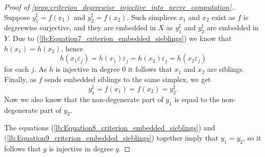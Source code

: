 \begin{proof}[Proof of \cref{prop:criterion_degreewise_injective_into_nerve_computation}.]
Suppose $y_1^\sharp =f(x_1)$ and $y_2^\sharp =f(x_2)$. Such simplices $x_1$ and $x_2$ exist as $f$ is degreewise surjective, and they are embedded in $X$ as $y_1^\sharp$ and $y_2^\sharp$ are embedded in $Y$. Due to (\ref{lb:Equation7_criterion_embedded_sieblings}) we know that $h(x_1)=h(x_2)$, hence
\[h(x_1\varepsilon _j)=h(x_1)\varepsilon _j=h(x_2)\varepsilon _j=h(x_2\varepsilon _j)\]
for each $j$. As $h$ is injective in degree $0$ it follows that $x_1$ and $x_2$ are siblings. Finally, as $f$ sends embedded siblings to the same simplex, we get
\begin{equation}\label{lb:Equation9_criterion_embedded_sieblings}
y_1^\sharp =f(x_1)=f(x_2)=y_2^\sharp .
\end{equation}
Now we also know that the non-degenerate part of $y_1$ is equal to the non-degenerate part of $y_2$.

The equations (\ref{lb:Equation8_criterion_embedded_sieblings}) and (\ref{lb:Equation9_criterion_embedded_sieblings}) together imply that $y_1=y_2$, so it follows that $g$ is injective in degree $q$.
\end{proof}


